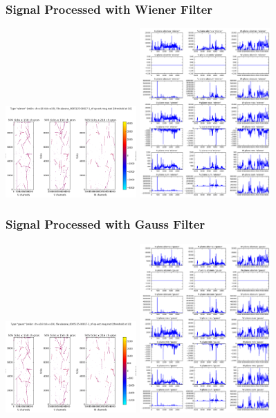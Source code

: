 \documentclass[xcolor=dvipsnames]{beamer}
\begin{document}
\begin{frame}[fragile]
  \frametitle{Signal Processed with Wiener Filter}
  \includegraphics[width=5cm]{figures/uboone_0005125-00017-1_nf-sp-wct-wiener_thumb.png}%
  \includegraphics[width=5cm]{figures/uboone_0005125-00017-1_nf-sp-wct-wiener_reduc.png}
\end{frame}

\begin{frame}[fragile]
  \frametitle{Signal Processed with Gauss Filter}
  \includegraphics[width=5cm]{figures/uboone_0005125-00017-1_nf-sp-wct-gauss_thumb.png}%
  \includegraphics[width=5cm]{figures/uboone_0005125-00017-1_nf-sp-wct-gauss_reduc.png}
\end{frame}
\end{document}
